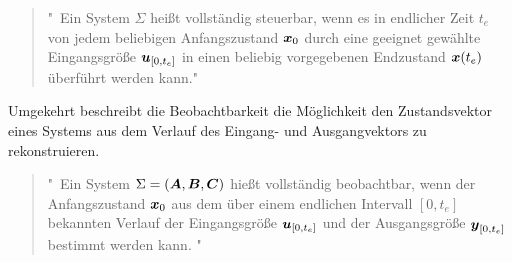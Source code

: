 \begin{quote}
"\ Ein System $\Sigma$ heißt vollständig steuerbar, wenn es in endlicher Zeit $t_e$ von jedem beliebigen Anfangszustand $\boldsymbol{x}_0$ durch eine geeignet gewählte Eingangsgröße $\boldsymbol{u}_{[0,t_e]}$ in einen beliebig vorgegebenen Endzustand $\boldsymbol{x}(t_e)$ überführt werden kann."
\end{quote}

Umgekehrt beschreibt die Beobachtbarkeit die Möglichkeit den Zustandsvektor eines Systems aus dem Verlauf des Eingang- und Ausgangvektors zu rekonstruieren.

\begin{quote}
"\ Ein System $\Sigma = (\boldsymbol{A},\boldsymbol{B},\boldsymbol{C})$ hießt vollständig beobachtbar, wenn der Anfangszustand $\boldsymbol{x}_0$ aus dem über einem endlichen Intervall $[0,t_e]$ bekannten Verlauf der Eingangsgröße $\boldsymbol{u}_{[0,t_e]}$ und der Ausgangsgröße $\boldsymbol{y}_{[0,t_e]}$ bestimmt werden kann. "
\end{quote}

